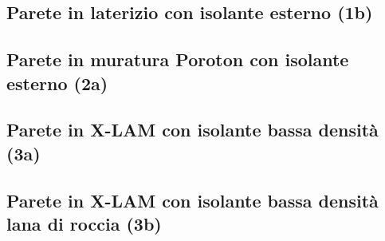 \documentclass[a4paper,10pt]{report}
\begin{document}
\begin{landscape}
        \subsection*{Parete in laterizio con isolante esterno (1b)}
                \begin{minipage}[c]{0.3\linewidth}
                        
                \end{minipage}
                \hspace*{0.15\linewidth}
                \begin{minipage}[c]{0.55\linewidth}
                            
                \end{minipage}
        \subsection*{Parete in muratura Poroton con isolante esterno (2a)}
                \begin{minipage}[c]{0.3\linewidth}
                        
                \end{minipage}
                \hspace*{0.15\linewidth}
                \begin{minipage}[c]{0.55\linewidth}
                            
                \end{minipage}
        \subsection*{Parete in X-LAM con isolante bassa densità (3a)}
                \begin{minipage}[c]{0.3\linewidth}
                        
                \end{minipage}
                \hspace*{0.15\linewidth}
                \begin{minipage}[c]{0.55\linewidth}
                            
                \end{minipage}
        \subsection*{Parete in X-LAM con isolante bassa densità lana di roccia (3b)}
                \begin{minipage}[c]{0.3\linewidth}
                        
                \end{minipage}
                \hspace*{0.15\linewidth}
                \begin{minipage}[c]{0.55\linewidth}
                            
                \end{minipage}

\end{landscape}
\end{document}
